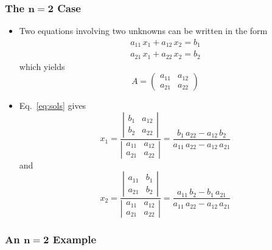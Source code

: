 \documentclass[12pt]{article}
\begin{document}
\subsubsection*{The $\mathbf{n=2}$ Case}
\begin{itemize}
\item Two equations involving two unknowns can be written in the form 
\begin{equation}
\begin{array}{c}
a_{11} \, x_1 + a_{12} \, x_2 = b_{1} \\
a_{21} \, x_1 + a_{22} \, x_2 = b_{2} 
\end{array}
\end{equation}
which yields
\begin{equation}
A = 
\left(
\begin{array}{cc}
a_{11} & a_{12} \\
a_{21} & a_{22} 
\end{array}
\right)
\end{equation}

\item Eq.~\ref{eq:sols} gives
\begin{equation}
x_1 = 
\frac{
\left|
\begin{array}{cc}
b_1 & a_{12} \\
b_2 & a_{22} 
\end{array}
\right|
}{
\left|
\begin{array}{cc}
a_{11} & a_{12} \\
a_{21} & a_{22} 
\end{array}
\right|
}
=
\frac{b_1 \, a_{22} - a_{12} \, b_2}
{a_{11} \, a_{22} - a_{12} \, a_{21}}
\end{equation}
and
\begin{equation}
x_2 = \frac{
\left|
\begin{array}{cc}
a_{11} & b_1 \\
a_{21} & b_2 
\end{array}
\right|
}{
\left|
\begin{array}{cc}
a_{11} & a_{12} \\
a_{21} & a_{22} 
\end{array}
\right|
}
=
\frac{a_{11} \, b_2 - b_1 \, a_{21}}
{a_{11} \, a_{22} - a_{12} \, a_{21}}
\end{equation}

\end{itemize}

\subsubsection*{An $\mathbf{n=2}$ Example}
\end{document}
